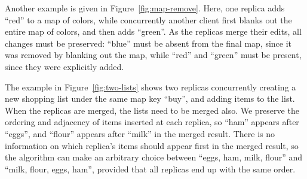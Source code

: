 \documentclass[10pt,journal,compsoc]{IEEEtran}
\begin{document}
Another example is given in Figure~\ref{fig:map-remove}. Here, one replica adds ``red'' to a map of colors, while concurrently another client first blanks out the entire map of colors, and then adds ``green''. As the replicas merge their edits, all changes must be preserved: ``blue'' must be absent from the final map, since it was removed by blanking out the map, while ``red'' and ``green'' must be present, since they were explicitly added.

\begin{figure*}
\centering
{}
\caption{Two replicas concurrently create ordered lists under the same map key.}\label{fig:two-lists}
\end{figure*}

The example in Figure~\ref{fig:two-lists} shows two replicas concurrently creating a new shopping list under the same map key ``buy'', and adding items to the list. When the replicas are merged, the lists need to be merged also. We preserve the ordering and adjacency of items inserted at each replica, so ``ham'' appears after ``eggs'', and ``flour'' appears after ``milk'' in the merged result. There is no information on which replica's items should appear first in the merged result, so the algorithm can make an arbitrary choice between ``eggs, ham, milk, flour'' and ``milk, flour, eggs, ham'', provided that all replicas end up with the same order.
\end{document}
